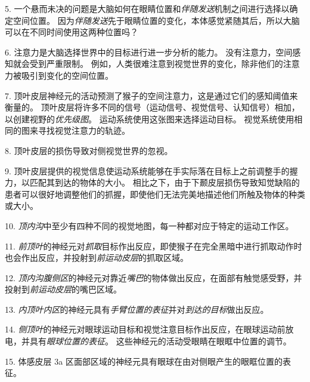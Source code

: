 5. 一个悬而未决的问题是大脑如何在眼睛位置和\textit{伴随发送}机制之间进行选择以确定空间位置。
因为\textit{伴随发送}先于眼睛位置的变化，本体感觉紧随其后，所以大脑可以在不同时间使用这两种位置吗？


6. 注意力是大脑选择世界中的目标进行进一步分析的能力。
没有注意力，空间感知就会受到严重限制。
例如，人类很难注意到视觉世界的变化，除非他们的注意力被吸引到变化的空间位置。


7. 顶叶皮层神经元的活动预测了猴子的空间注意力，这是通过它们的感知阈值来衡量的。
顶叶皮层将许多不同的信号（运动信号、视觉信号、认知信号）相加，以创建视野的\textit{优先级图}。
运动系统使用这张图来选择运动目标。
视觉系统使用相同的图来寻找视觉注意力的轨迹。


8. 顶叶皮层的损伤导致对侧视觉世界的忽视。


9. 顶叶皮层提供的视觉信息使运动系统能够在手实际落在目标上之前调整手的握力，以匹配其到达的物体的大小。
相比之下，由于下颞皮层损伤导致知觉缺陷的患者可以很好地调整他们的抓握，即使他们无法完美地描述他们所触及物体的种类或大小。


10. \textit{顶内沟}中至少有四种不同的视觉地图，每一种都对应于特定的运动工作区。


11. \textit{前顶叶}的神经元对\textit{抓取}目标作出反应，即使猴子在完全黑暗中进行抓取动作时也会作出反应，并投射到\textit{前运动皮层}的抓取区域。


12. \textit{顶内沟腹侧区}的神经元对靠近\textit{嘴巴}的物体做出反应，在面部有触觉感受野，并投射到\textit{前运动皮层}的嘴巴区域。 


13. \textit{内顶叶内区}的神经元具有\textit{手臂位置的表征}并对\textit{到达的目标}做出反应。


14. \textit{侧顶叶}的神经元对眼球运动目标和视觉注意目标作出反应，在眼球运动前放电，并具有\textit{眼球位置的表征}。
这些神经元的活动受眼睛在眼眶中位置的调节。


15. 体感皮层 3a 区面部区域的神经元具有眼球在由对侧眼产生的眼眶位置的表征。

